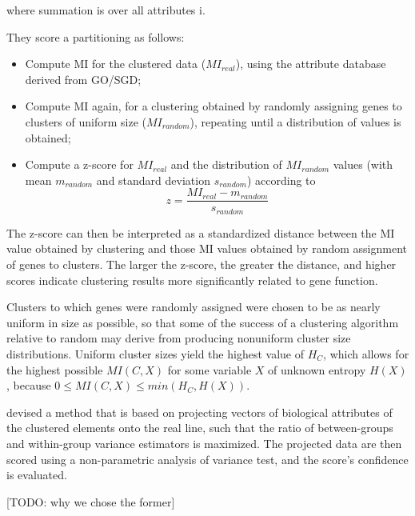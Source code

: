 where summation is over all attributes i.

They score a partitioning as follows: 
\begin{itemize}
 \item Compute MI for the clustered data ($MI_{real}$), using the attribute database derived from GO/SGD; 
 \item Compute MI again, for a clustering obtained by randomly assigning genes to clusters of uniform size ($MI_{random}$), repeating until a distribution of values is obtained; 
 \item Compute a z-score for $MI_{real}$ and the distribution of $MI_{random}$ values (with mean $m_{random}$ and standard deviation $s_{random}$) according to 
\[
z = \frac{MI_{real}-m_{random}}{s_{random}} 
\]
\end{itemize}

The z-score can then be interpreted as a standardized distance between the MI value obtained by clustering and those MI values obtained by random assignment of genes to clusters. 
The larger the z-score, the greater the distance, and higher scores indicate clustering results more significantly related to gene function.

Clusters to which genes were randomly assigned were chosen to be as nearly uniform in size as possible, so that some of the success of a clustering algorithm relative 
to random may derive from producing nonuniform cluster size distributions. Uniform cluster sizes yield the highest value of $H_{C}$, which allows for the highest 
possible $MI(C,X)$ for some variable $X$ of unknown entropy $H(X)$, because $0 \leq MI(C,X) \leq min(H_{C},H(X))$.


\citet{gatviks03scoring} devised a method that is based on projecting vectors of biological attributes of the clustered elements onto the real line, such that the ratio 
of between-groups and within-group variance estimators is maximized. The projected data are then scored using a non-parametric analysis of variance test, and the 
score’s conﬁdence is evaluated.

[TODO: why we chose the former]


